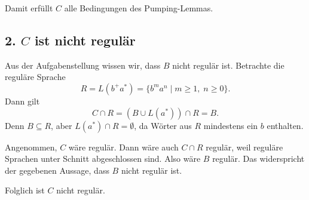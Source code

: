 \documentclass[a4paper,12pt]{article}
\begin{document}
Damit erfüllt $C$ alle Bedingungen des Pumping-Lemmas.

\subsection*{2. $C$ ist nicht regulär}

Aus der Aufgabenstellung wissen wir, dass $B$ nicht regulär ist.
Betrachte die reguläre Sprache
\[
    R=L(b^+a^*)=\{b^m a^n\mid m\ge 1,\; n\ge 0\}.
\]
Dann gilt
\[
    C\cap R
    =
    (B\cup L(a^*))\cap R
    =
    B.
\]
Denn $B\subseteq R$, aber $L(a^*)\cap R=\emptyset$, da Wörter aus $R$ mindestens ein $b$ enthalten.

Angenommen, $C$ wäre regulär. Dann wäre auch $C\cap R$ regulär, weil reguläre Sprachen unter Schnitt abgeschlossen sind.
Also wäre $B$ regulär. Das widerspricht der gegebenen Aussage, dass $B$ nicht regulär ist.

Folglich ist $C$ nicht regulär.
\end{document}
